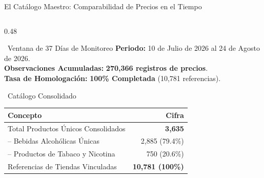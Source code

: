 \documentclass[aspectratio=169, 10pt]{beamer}
\begin{document}
\begin{frame}{El Catálogo Maestro: Comparabilidad de Precios en el Tiempo}
\begin{columns}[T]
        \begin{column}{0.48\textwidth}
            \begin{alertblock}{\faChartLine\ Ventana de 37 Días de Monitoreo}
                \scriptsize
                \textbf{Periodo:} 10 de Julio de 2026 al 24 de Agosto de 2026.\\
                \textbf{Observaciones Acumuladas:} \textbf{270,366 registros de precios}.\\
                \textbf{Tasa de Homologación:} \textbf{100\% Completada} (10,781 referencias).
            \end{alertblock}
            \vspace{0.15cm}
            \begin{block}{\faCubes\ Catálogo Consolidado}
                \centering
                \scriptsize
                \begin{tabular}{lr}
                    \toprule
                    \textbf{Concepto} & \textbf{Cifra} \\
                    \midrule
                    Total Productos Únicos Consolidados & \textbf{3,635} \\
                    -- Bebidas Alcohólicas Únicas & 2,885 (79.4\%) \\
                    -- Productos de Tabaco y Nicotina & 750 (20.6\%) \\
                    Referencias de Tiendas Vinculadas & \textbf{10,781 (100\%)} \\
                    \bottomrule
                \end{tabular}
            \end{block}
        \end{column}
    \end{columns}
\end{frame}
\end{document}
